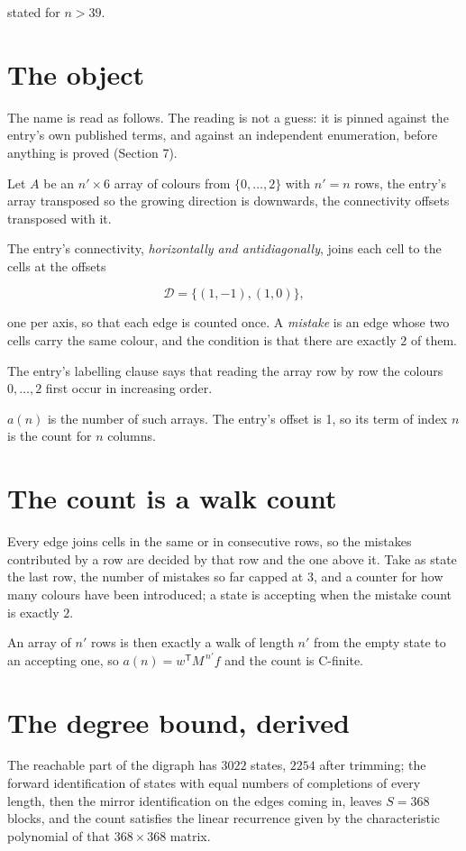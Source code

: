 \documentclass[11pt]{article}
\theoremstyle{definition}
\begin{document}
stated for $n > 39$.

\section{The object}

The name is read as follows. The reading is not a guess: it is pinned against the entry's own published terms, and against an independent enumeration, before anything is proved (Section 7).

Let $A$ be an $n' \times 6$ array of colours from $\{0,\dots,2\}$ with $n' = n$ rows, the entry's array transposed so the growing direction is downwards, the connectivity offsets transposed with it.

The entry's connectivity, {\itshape horizontally and antidiagonally}, joins each cell to the cells at the offsets

\[\mathcal{D} = \{(1,-1), (1,0)\},\]

one per axis, so that each edge is counted once. A {\itshape mistake} is an edge whose two cells carry the same colour, and the condition is that there are exactly $2$ of them.

The entry's labelling clause says that reading the array row by row the colours $0,\dots,2$ first occur in increasing order.

$a(n)$ is the number of such arrays. The entry's offset is 1, so its term of index $n$ is the count for $n$ columns.

\section{The count is a walk count}

Every edge joins cells in the same or in consecutive rows, so the mistakes contributed by a row are decided by that row and the one above it. Take as state the last row, the number of mistakes so far capped at $3$, and a counter for how many colours have been introduced; a state is accepting when the mistake count is exactly $2$.

An array of $n'$ rows is then exactly a walk of length $n'$ from the empty state to an accepting one, so $a(n) = w^{\mathsf T}M^{\,n'}f$ and the count is C-finite.

\section{The degree bound, derived}

The reachable part of the digraph has $3022$ states, $2254$ after trimming; the forward identification of states with equal numbers of completions of every length, then the mirror identification on the edges coming in, leaves $S = 368$ blocks, and the count satisfies the linear recurrence given by the characteristic polynomial of that $368\times368$ matrix.
\end{document}
